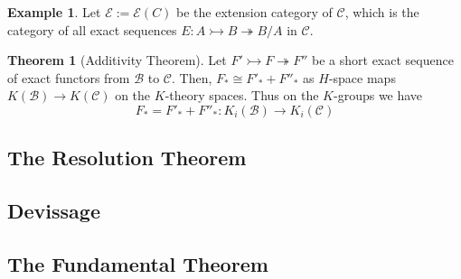\documentclass{article}
\theoremstyle{definition}
\newtheorem{theorem}{Theorem}[section]
\theoremstyle{definition}
\theoremstyle{definition}
\theoremstyle{definition}
\theoremstyle{definition}
\theoremstyle{definition}
\theoremstyle{definition}
\newtheorem{example}{Example}[theorem]
\begin{document}
\begin{tcolorbox}[colback=yellow!5!white,colframe=yellow!30!white]
\begin{example}
Let $\mathcal{E}:=\mathcal{E}(C)$ be the extension category of $\mathcal{C}$, which is the category of all exact sequences $E: A\rightarrowtail B\twoheadrightarrow B/A$ in $\mathcal{C}$. 
\end{example}
\end{tcolorbox}

\begin{tcolorbox}[colback=red!5!white,colframe=red!30!white]
\begin{theorem}[Additivity Theorem]
Let $F'\rightarrowtail F \twoheadrightarrow F''$ be a short exact sequence of exact functors from $\mathcal{B}$ to $\mathcal{C}$. Then, $F_*\cong F'_*+F''_*$ as $H$-space maps $K(\mathcal{B})\to K(\mathcal{C})$ on the $K$-theory spaces. Thus on the $K$-groups we have 
\[F_*=F'_*+F''_*: K_i(\mathcal{B})\to K_i(\mathcal{C})\]
\end{theorem}
\end{tcolorbox}









\subsection{The Resolution Theorem}

\subsection{Devissage}

\subsection{The Fundamental Theorem}











\printbibliography
\end{document}
